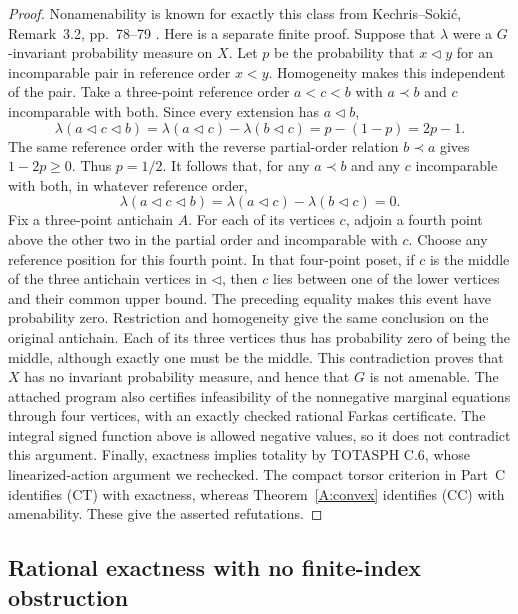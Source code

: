 \begin{proof}
Nonamenability is known for exactly this class from
Kechris--Soki\'c, Remark~3.2, pp.~78--79
\cite{ABKechrisSokic2012}. Here is a separate finite proof. Suppose
that $\lambda$ were a $G$-invariant probability measure on $X$.
Let $p$ be the probability that $x\triangleleft y$ for an
incomparable pair in reference order $x<y$. Homogeneity makes
this independent of the pair. Take a three-point reference order
$a<c<b$ with $a\prec b$ and $c$ incomparable with both. Since
every extension has $a\triangleleft b$,
\[
 \lambda(a\triangleleft c\triangleleft b)
 =\lambda(a\triangleleft c)-\lambda(b\triangleleft c)
 =p-(1-p)=2p-1.
\]
The same reference order with the reverse partial-order relation
$b\prec a$ gives $1-2p\geq0$. Thus $p=1/2$. It follows that,
for any $a\prec b$ and any $c$ incomparable with both, in whatever
reference order,
\[
 \lambda(a\triangleleft c\triangleleft b)
 =\lambda(a\triangleleft c)-\lambda(b\triangleleft c)=0.
\]
Fix a three-point antichain $A$. For each of its vertices $c$,
adjoin a fourth point above the other two in the partial order
and incomparable with $c$. Choose any reference position for this
fourth point. In that four-point poset, if $c$ is the middle of
the three antichain vertices in $\triangleleft$, then $c$ lies
between one of the lower vertices and their common upper bound.
The preceding equality makes this event have probability zero.
Restriction and homogeneity give the same conclusion on the
original antichain. Each of its three vertices thus has probability
zero of being the middle, although exactly one must be the middle.
This contradiction proves that $X$ has no invariant probability
measure, and hence that $G$ is not amenable. The attached program
also certifies infeasibility of the nonnegative marginal equations
through four vertices, with an exactly checked rational Farkas
certificate. The integral signed function above is allowed negative
values, so it does not contradict this argument.
Finally, exactness implies totality by TOTASPH C.6, whose
linearized-action argument we rechecked. The compact torsor
criterion in Part~C identifies (CT) with exactness, whereas
Theorem~\ref{A:convex} identifies (CC) with amenability.
These give the asserted refutations.
\end{proof}


\subsection{Rational exactness with no finite-index obstruction}

